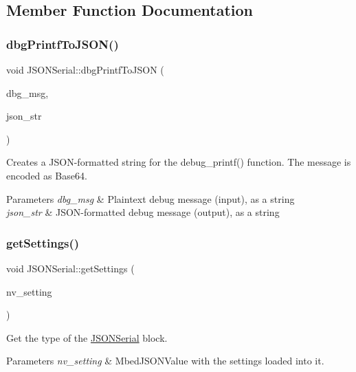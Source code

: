 \subsection{Member Function Documentation}
\mbox{\label{classJSONSerial_a6070c03a5caca84d5bd4237db0bd28c4}} 
\subsubsection{\texorpdfstring{dbg\+Printf\+To\+J\+S\+O\+N()}{dbgPrintfToJSON()}}
{\footnotesize\ttfamily void J\+S\+O\+N\+Serial\+::dbg\+Printf\+To\+J\+S\+ON (\begin{DoxyParamCaption}\item[{string \&}]{dbg\+\_\+msg,  }\item[{string \&}]{json\+\_\+str }\end{DoxyParamCaption})}

Creates a J\+S\+O\+N-\/formatted string for the debug\+\_\+printf() function. The message is encoded as Base64. 
\begin{DoxyParams}{Parameters}
{\em dbg\+\_\+msg} & Plaintext debug message (input), as a string \\
\hline
{\em json\+\_\+str} & J\+S\+O\+N-\/formatted debug message (output), as a string \\
\hline
\end{DoxyParams}
\mbox{\label{classJSONSerial_a7f12c4a3d58ff26825fbaf8694b7a795}} 
\subsubsection{\texorpdfstring{get\+Settings()}{getSettings()}}
{\footnotesize\ttfamily void J\+S\+O\+N\+Serial\+::get\+Settings (\begin{DoxyParamCaption}\item[{Mbed\+J\+S\+O\+N\+Value \&}]{nv\+\_\+setting }\end{DoxyParamCaption})}

Get the type of the \hyperlink{classJSONSerial}{J\+S\+O\+N\+Serial} block. 
\begin{DoxyParams}{Parameters}
{\em nv\+\_\+setting} & Mbed\+J\+S\+O\+N\+Value with the settings loaded into it. \\
\hline
\end{DoxyParams}
\mbox{\label{classJSONSerial_ace1745d4308eef3f8734186cf55496e2}} 

